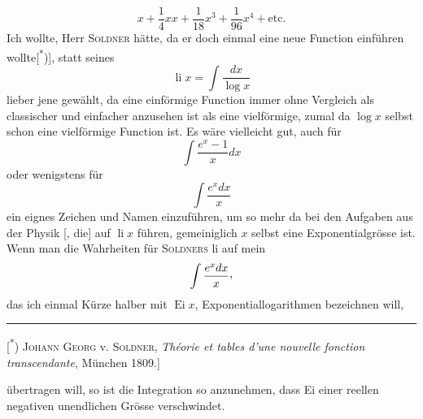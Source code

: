 \[
x+\frac{1}{4}xx+\frac{1}{18}x^3+\frac{1}{96}x^4+\text{etc.}
\]
\noindent Ich wollte, Herr \textsc{Soldner} hätte, da er doch einmal eine neue Function einführen wollte[\textsuperscript{*})], statt seines
\[
\operatorname{li}x=\int\frac{dx}{\log x}
\]
\noindent lieber jene gewählt, da eine einförmige Function immer ohne Vergleich als classischer und einfacher anzusehen ist als eine vielförmige, zumal da $\log x$ selbst schon eine vielförmige Function ist. Es wäre vielleicht gut, auch für
\[
\int\frac{e^x-1}{x}dx
\]
\noindent oder wenigstens für
\[
\int\frac{e^x dx}{x}
\]
\noindent ein eignes Zeichen und Namen einzuführen, um so mehr da bei den Aufgaben aus der Physik [, die] auf $\operatorname{li}x$ führen, gemeiniglich $x$ selbst eine Exponentialgrösse ist. Wenn man die Wahrheiten für \textsc{Soldners} li auf mein
\[
\int\frac{e^x dx}{x}\mathpunct{\raisebox{.35ex}{,}}
\]
\noindent das ich einmal Kürze halber mit $\operatorname{Ei}x$, Exponentiallogarithmen bezeichnen will,
\par\medskip\noindent\rule{.24\linewidth}{.4pt}\par\smallskip
{\small
\noindent\hspace*{\parindent}[\textsuperscript{*}) \textsc{Johann Georg} v. \textsc{Soldner}, \textit{Théorie et tables d’une nouvelle fonction transcendante}, München 1809.]
\par}
\clearpage{}
\noindent übertragen will, so ist die Integration so anzunehmen, dass Ei einer reellen negativen unendlichen Grösse verschwindet.

